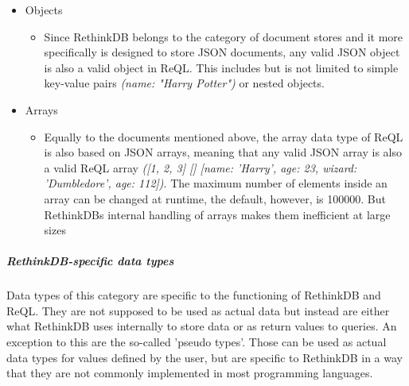 \begin{itemize}
\begin{itemize}
    \end{itemize}
    \item Objects
    \begin{itemize}
        \item Since RethinkDB belongs to the category of document stores and it more specifically is designed to  store JSON documents, any valid JSON object is also a valid object in ReQL. This includes but is not limited to simple key-value pairs \textit{({name: "Harry Potter"})} or nested objects. 
    \end{itemize}
    \item Arrays
    \begin{itemize}
        \item Equally to the documents mentioned above, the array data type of ReQL is also based on JSON arrays, meaning that any valid JSON array is also a valid ReQL array \textit{([1, 2, 3] [] [{name: 'Harry', age: 23}, {wizard: 'Dumbledore', age: 112}])}. The maximum number of elements inside an array can be changed at runtime, the default, however, is 100000. But RethinkDBs internal handling of arrays makes them inefficient at large sizes
    \end{itemize}
\end{itemize}

\subparagraph{RethinkDB-specific data types}
Data types of this category are specific to the functioning of RethinkDB and ReQL. They are not supposed to be used as actual data but instead are either what RethinkDB uses internally to store data or as return values to queries. An exception to this are the so-called 'pseudo types'. Those can be used as actual data types for values defined by the user, but are specific to RethinkDB in a way that they are not commonly implemented in most programming languages.

